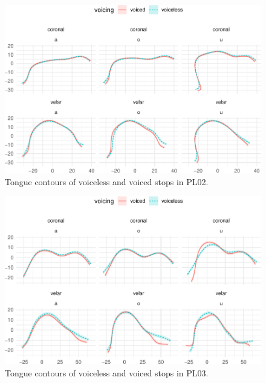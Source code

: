 \documentclass[12pt,]{article}
\begin{document}
\begin{figure}

{\centering \includegraphics[width=.8\textwidth]{2018-polar-gam_files/figure-latex/tongues-pl02-1} 

}

\caption{Tongue contours of voiceless and voiced stops in PL02.}\label{f:tongues-pl02}
\end{figure}

\begin{figure}

{\centering \includegraphics[width=.8\textwidth]{2018-polar-gam_files/figure-latex/tongues-pl03-1} 

}

\caption{Tongue contours of voiceless and voiced stops in PL03.}\label{f:tongues-pl03}
\end{figure}
\end{document}

